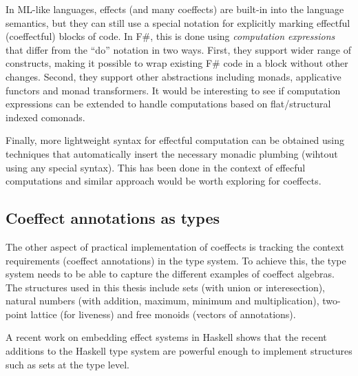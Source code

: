 In ML-like languages, effects (and many coeffects) are built-in into the language semantics, 
but they can still use a special notation for explicitly marking effectful (coeffectful) 
blocks of code. In F\#, this is done using \emph{computation expressions}  \cite{app-computation-zoo}
that differ from the ``do'' notation in two ways. First, they support wider range of 
constructs, making it possible to wrap existing F\# code in a block without other changes.
Second, they support other abstractions including monads, applicative functors and monad
transformers. It would be interesting to see if computation expressions can be extended to
handle computations based on flat/structural indexed comonads.

Finally, more lightweight syntax for effectful computation can be obtained using
techniques that automatically insert the necessary monadic plumbing (wihtout using any
special syntax). This has been done in the context of effecful computations \cite{monads-lightweight-ml}
and similar approach would be worth exploring for coeffects.


\subsection{Coeffect annotations as types}

The other aspect of practical implementation of coeffects is tracking the context requirements
(coeffect annotations) in the type system. To achieve this, the type system needs to be able to 
capture the different examples of coeffect algebras. The structures used in this thesis include sets 
(with union or interesection), natural numbers (with addition, maximum, minimum and multiplication),
two-point lattice (for liveness) and free monoids (vectors of annotations).

A recent work on embedding effect systems in Haskell \cite{effects-embedding} shows that the
recent additions to the Haskell type system are powerful enough to implement structures such
as sets at the type level.  

\cite{types-dependent-ml}
\cite{types-units-of-measure}
\cite{app-inforich}


